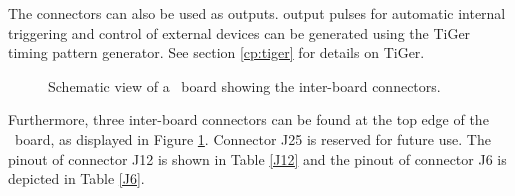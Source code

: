 	
	The connectors can also be used as outputs. 
	 output pulses for automatic internal triggering and control of external devices 
	can be generated using the TiGer timing pattern generator. See section \ref{cp:tiger} for details on TiGer. 
		\begin{figure}[ht]
			\begin{center}
				
				\caption{Schematic view of a \deviceName\ board showing the inter-board connectors.\label{fig:schematics}}
			\end{center} 
		\end{figure}

	Furthermore, three inter-board connectors can be found at the top edge of the \deviceName\ board, 
	as displayed in Figure \ref{fig:schematics}. 
	Connector J25 is reserved for future use. The pinout of connector J12 is shown in Table \ref{J12} and the pinout of connector J6 is depicted in Table \ref{J6}.

